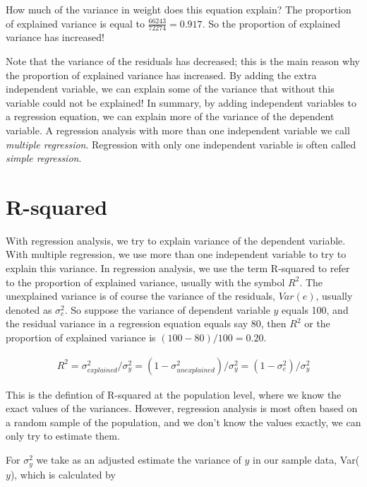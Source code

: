 \documentclass[]{book}\usepackage[]{graphicx}\usepackage[]{color}
\begin{document}
How much of the variance in weight does this equation explain? The proportion of explained variance is equal to $ \frac{66243}{72274}=0.917$. So the proportion of explained variance has increased!

Note that the variance of the residuals has decreased; this is the main reason why the proportion of explained variance has increased. By adding the extra independent variable, we can explain some of the variance that without this variable could not be explained! In summary, by adding independent variables to a regression equation, we can explain more of the variance of the dependent variable. A regression analysis with more than one independent variable we call \textit{multiple regression}. Regression with only one independent variable is often called \textit{simple regression}.







\section{R-squared}

With regression analysis, we try to explain variance of the dependent variable. With multiple regression, we use more than one independent variable to try to explain this variance. In regression analysis, we use the term R-squared to refer to the proportion of explained variance, usually with the symbol $R^2$. The unexplained variance is of course the variance of the residuals, $Var(e)$, usually denoted as $\sigma_e^2$. So suppose the variance of dependent variable $y$ equals 100, and the residual variance in a regression equation equals say 80, then $R^2$ or the proportion of explained variance is $(100-80)/100=0.20$.

\begin{eqnarray}
R^2 = \sigma^2_{explained}/ \sigma^2_y = (1-\sigma^2_{unexplained})/\sigma^2_y = (1-\sigma^2_e)/\sigma^2_y
\end{eqnarray}

This is the defintion of R-squared at the population level, where we know the exact values of the variances. However, regression analysis is most often based on a random sample of the population, and we don't know the values exactly, we can only try to estimate them.

For $\sigma_y^2$ we take as an adjusted estimate the variance of $y$ in our sample data, Var($y$), which is calculated by
\end{document}
